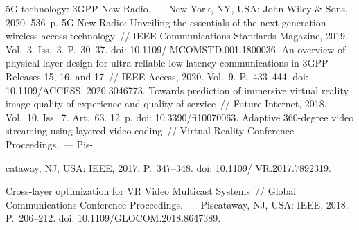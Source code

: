 \begin{multicols}{2}
{\small\frenchspacing
 {%
 \begin{thebibliography}{99}
 5G technology: 3GPP New Radio.~--- New York, NY, 
USA:  John Wiley \& Sons, 2020. 536~p.
 5G New Radio: Unveiling the essentials of the next 
generation wireless access technology~// IEEE Communications Standards Magazine, 2019. 
Vol.~3. Iss.~3. P.~30--37. doi: 10.1109/ \mbox{MCOMSTD}.001.1800036.
 An overview of physical layer design for ultra-reliable 
low-latency communications in 3GPP Releases 15, 16, and 17~// IEEE Access, 2020. Vol.~9. 
P.~433--444. doi: 10.1109/\mbox{ACCESS}. 2020.3046773.
 Towards prediction of immersive virtual reality 
image quality of experience and quality of service~// Future Internet, 2018. Vol.~10. Iss.~7. 
Art.~63. 12~p. doi: 10.3390/fi10070063.
 Adaptive 360-degree video 
streaming using layered video coding~//  Virtual Reality Conference Proceedings.~--- 
Pis-\linebreak\vspace*{-12pt}
 
 \pagebreak
 
 \noindent
 cataway, NJ, USA: IEEE, 2017. P.~347--348. doi: 10.1109/ VR.2017.7892319.

 Cross-layer optimization for VR Video Multicast Systems~// 
 Global Communications Conference Proceedings.~--- Piscataway, NJ, USA: 
IEEE, 2018. P.~206--212. doi: 10.1109/GLOCOM.2018.8647389.


\end{thebibliography}}}
\end{multicols}
